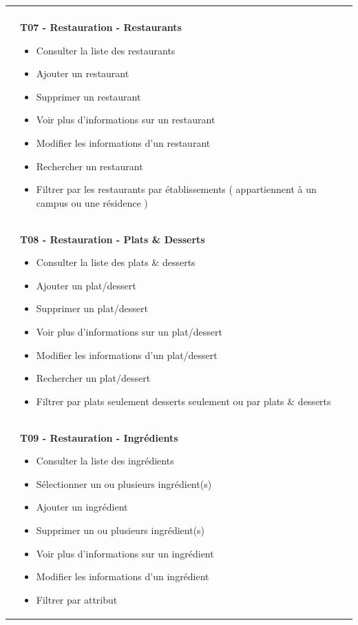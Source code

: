 \begin{longtable}{|Z{3cm}|L{10cm}|}
\begin{itemize}
    \end{itemize}\\ &
    \textbf{T07 - Restauration - Restaurants}
    \begin{itemize}
        \item Consulter la liste des restaurants
        \item Ajouter un restaurant
        \item Supprimer un restaurant
        \item Voir plus d'informations sur un restaurant
        \item Modifier les informations d'un restaurant
        \item Rechercher un restaurant
        \item Filtrer par les restaurants par établissements ( appartiennent à un campus ou une résidence )
    \end{itemize}\\
    &
    \textbf{T08 - Restauration - Plats \& Desserts}
    \begin{itemize}
        \item Consulter la liste des plats \& desserts
        \item Ajouter un plat/dessert
        \item Supprimer un plat/dessert
        \item Voir plus d'informations sur un plat/dessert
        \item Modifier les informations d'un plat/dessert
        \item Rechercher un plat/dessert
        \item Filtrer par plats seulement desserts seulement ou par plats \& desserts
    \end{itemize}\\
    &
    \textbf{T09 - Restauration - Ingrédients}
    \begin{itemize}
        \item Consulter la liste des ingrédients
        \item Sélectionner un ou plusieurs ingrédient(s)
        \item Ajouter un ingrédient
        \item Supprimer un ou plusieurs ingrédient(s)
        \item Voir plus d'informations sur un ingrédient
        \item Modifier les informations d'un ingrédient
        \item Filtrer par attribut
    \end{itemize} \\

\end{longtable}
